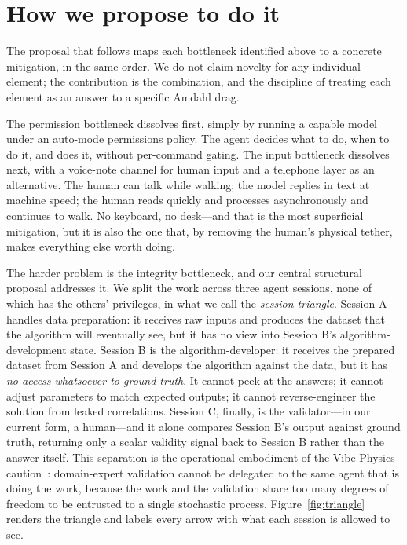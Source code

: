 \documentclass[11pt]{article}
\begin{document}
\section{How we propose to do it}

The proposal that follows maps each bottleneck identified above to a concrete mitigation, in the same order. We do not claim novelty for any individual element; the contribution is the combination, and the discipline of treating each element as an answer to a specific Amdahl drag.

The permission bottleneck dissolves first, simply by running a capable model under an auto-mode permissions policy. The agent decides what to do, when to do it, and does it, without per-command gating. The input bottleneck dissolves next, with a voice-note channel for human input and a telephone layer as an alternative. The human can talk while walking; the model replies in text at machine speed; the human reads quickly and processes asynchronously and continues to walk. No keyboard, no desk---and that is the most superficial mitigation, but it is also the one that, by removing the human's physical tether, makes everything else worth doing.

The harder problem is the integrity bottleneck, and our central structural proposal addresses it. We split the work across three agent sessions, none of which has the others' privileges, in what we call the \emph{session triangle}. Session A handles data preparation: it receives raw inputs and produces the dataset that the algorithm will eventually see, but it has no view into Session B's algorithm-development state. Session B is the algorithm-developer: it receives the prepared dataset from Session A and develops the algorithm against the data, but it has \emph{no access whatsoever to ground truth}. It cannot peek at the answers; it cannot adjust parameters to match expected outputs; it cannot reverse-engineer the solution from leaked correlations. Session C, finally, is the validator---in our current form, a human---and it alone compares Session B's output against ground truth, returning only a scalar validity signal back to Session B rather than the answer itself. This separation is the operational embodiment of the Vibe-Physics caution~\cite{schwartz2026vibe}: domain-expert validation cannot be delegated to the same agent that is doing the work, because the work and the validation share too many degrees of freedom to be entrusted to a single stochastic process. Figure~\ref{fig:triangle} renders the triangle and labels every arrow with what each session is allowed to see.
\end{document}
